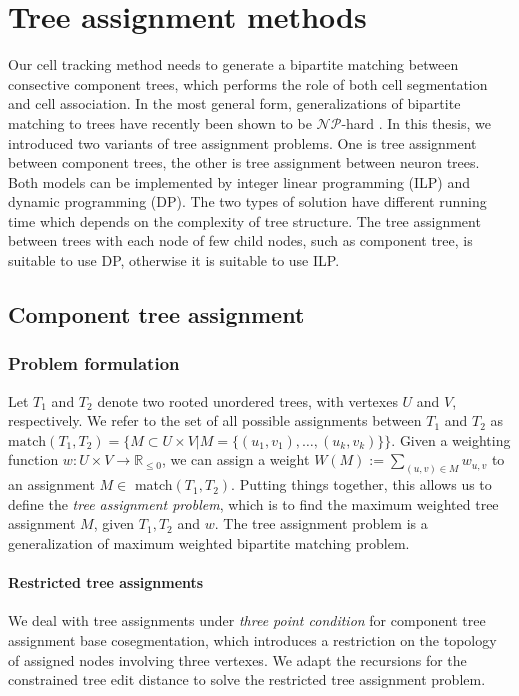 \chapter{Tree assignment methods} \label{chpt:treeassign}
Our cell tracking method needs to generate a bipartite matching \cite{mosig2009tracking, Xiao:2011} between consective component trees, which performs the role of both cell segmentation and cell association. In the most general form, generalizations of bipartite matching to trees have recently been shown to be $\mathcal{NP}$-hard \cite{canzar2011tree}.
In this thesis, we introduced two variants of tree assignment problems. One is tree assignment between component trees, the other is tree assignment between neuron trees. Both models can be implemented by integer linear programming (ILP) and dynamic programming (DP). The two types of solution have different running time which depends on the complexity of tree structure. The tree assignment between trees with each node of few child nodes, such as component tree, is suitable to use DP, otherwise it is suitable to use ILP.

\section{Component tree assignment}
\subsection{Problem formulation}
Let $T_1$ and $T_2$ denote two rooted unordered trees, with vertexes $U$ and $V$, respectively.  We refer to the set of all possible assignments between $T_1$ and $T_2$ as $\mathrm{match}(T_1,T_2) =\Big\{M \subset U \times V | M = \{(u_1,v_1),\ldots,(u_k,v_k)\}\Big\}$. Given a weighting function $w:U\times V \to \mathbb{R}_{\le 0}$, we can assign a weight $W(M) := \sum_{(u,v)\in M}w_{u,v}$ to an assignment $M \in$ match$(T_1,T_2)$. Putting things together, this allows us to define the \emph{tree assignment problem}, which is to find the maximum weighted tree assignment $M$, given $T_1,T_2$ and $w$. The tree assignment problem is a generalization of maximum weighted bipartite matching problem.
\subsubsection{Restricted tree assignments}
We deal with tree assignments under \emph{three point condition} for component tree assignment base cosegmentation, which introduces a restriction on the topology of assigned nodes involving three vertexes. We adapt the recursions for the constrained tree edit distance \cite{Jiang:95} to solve the restricted tree assignment problem.


